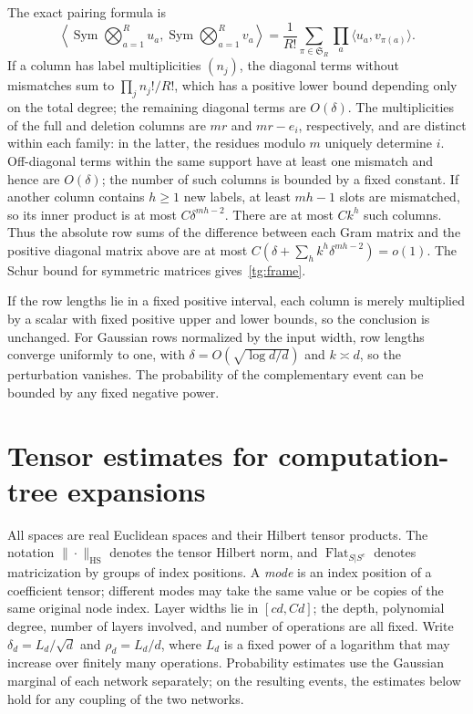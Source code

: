 \documentclass[a4paper]{tufte-handout}
\begin{document}
\begin{fullwidth}
The exact pairing formula is
\[
 \left\langle\operatorname{Sym}\bigotimes_{a=1}^Ru_a,
 \operatorname{Sym}\bigotimes_{a=1}^Rv_a\right\rangle
 =\frac1{R!}\sum_{\pi\in\mathfrak S_R}\prod_a\langle u_a,v_{\pi(a)}\rangle.
\]
If a column has label multiplicities $(n_j)$, the diagonal terms without mismatches sum to $\prod_jn_j!/R!$,
which has a positive lower bound depending only on the total degree; the remaining diagonal terms are $O(\delta)$.
The multiplicities of the full and deletion columns are $mr$ and $mr-e_i$, respectively, and are distinct within each family: in the latter, the residues modulo $m$ uniquely determine $i$.
Off-diagonal terms within the same support have at least one mismatch and hence are $O(\delta)$; the number of such columns is bounded by a fixed constant.
If another column contains $h\ge1$ new labels, at least $mh-1$ slots are mismatched,
so its inner product is at most $C\delta^{mh-2}$. There are at most $Ck^h$ such columns.
Thus the absolute row sums of the difference between each Gram matrix and the positive diagonal matrix above are at most
$C(\delta+\sum_hk^h\delta^{mh-2})=o(1)$. The Schur bound for symmetric matrices gives~\eqref{tg:frame}.

If the row lengths lie in a fixed positive interval, each column is merely multiplied by a scalar with fixed positive upper and lower bounds, so the conclusion is unchanged.
For Gaussian rows normalized by the input width, row lengths converge uniformly to one, with
$\delta=O(\sqrt{\log d/d})$ and $k\asymp d$, so the perturbation vanishes. The probability of the complementary event can be bounded by any fixed negative power.

\section{Tensor estimates for computation-tree expansions}
\label{fp:core-section}

All spaces are real Euclidean spaces and their Hilbert tensor products. The notation $\|\cdot\|_{\mathrm{HS}}$ denotes the tensor Hilbert norm,
and $\operatorname{Flat}_{S|S^c}$ denotes matricization by groups of index positions.
A \emph{mode} is an index position of a coefficient tensor; different modes may take the same value or be copies of the same original node index. Layer widths lie in $[cd,Cd]$;
the depth, polynomial degree, number of layers involved, and number of operations are all fixed.
Write $\delta_d=L_d/\sqrt d$ and $\rho_d=L_d/d$, where $L_d$ is a fixed power of a logarithm that may increase over finitely many
operations. Probability estimates use the Gaussian marginal of each network separately;
on the resulting events, the estimates below hold for any coupling of the two networks.


\end{fullwidth}
\end{document}

